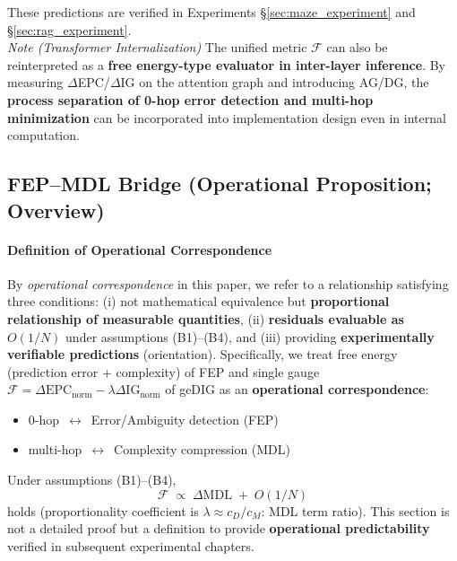 \documentclass[12pt]{article}
\newcommand{\F}{\mathcal{F}}
\newcommand{\gednorm}{\Delta\mathrm{EPC}_{\mathrm{norm}}}
\newcommand{\ignorm}{\Delta\mathrm{IG}_{\mathrm{norm}}}
\begin{document}
These predictions are verified in Experiments \S\ref{sec:maze_experiment} and \S\ref{sec:rag_experiment}.
\\[0.2em]
\noindent\textit{Note (Transformer Internalization)}\; The unified metric $\F$ can also be reinterpreted as a \textbf{free energy-type evaluator in inter-layer inference}. By measuring $\Delta$EPC/$\Delta$IG on the attention graph and introducing AG/DG, the \textbf{process separation of 0-hop error detection and multi-hop minimization} can be incorporated into implementation design even in internal computation.

\subsection{FEP--MDL Bridge (Operational Proposition; Overview)}

\paragraph{Definition of Operational Correspondence}\label{para:operational_correspondence}
By \emph{operational correspondence} in this paper, we refer to a relationship satisfying three conditions: (i) not mathematical equivalence but \textbf{proportional relationship of measurable quantities}, (ii) \textbf{residuals evaluable as $O(1/N)$} under assumptions (B1)--(B4), and (iii) providing \textbf{experimentally verifiable predictions} (orientation). Specifically, we treat free energy (prediction error + complexity) of FEP and single gauge $\F=\gednorm-\lambda\ignorm$ of geDIG as an \textbf{operational correspondence}:
\begin{itemize}[leftmargin=1.2em]
  \item 0-hop \,$\leftrightarrow$\, Error/Ambiguity detection (FEP)
  \item multi-hop \,$\leftrightarrow$\, Complexity compression (MDL)
\end{itemize}
Under assumptions (B1)--(B4),
\begin{equation*}
  \F\;\propto\; \Delta\mathrm{MDL}\; +\; O(1/N)
\end{equation*}
holds (proportionality coefficient is $\lambda\approx c_{\!D}/c_{\!M}$: MDL term ratio). This section is not a detailed proof but a definition to provide \textbf{operational predictability} verified in subsequent experimental chapters.
\end{document}
